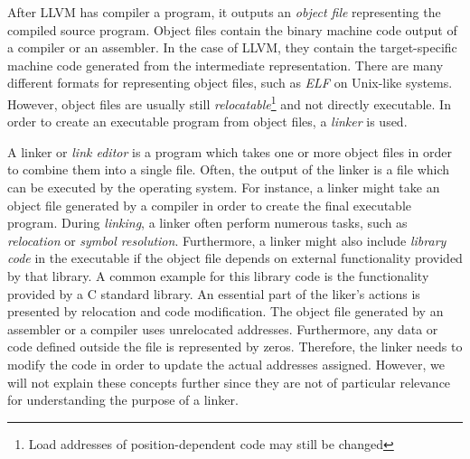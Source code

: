 
After LLVM has compiler a program, it outputs an \emph{object file} representing the compiled source program.
Object files contain the binary machine code output of a compiler or an assembler.
In the case of LLVM, they contain the target-specific machine code generated from the intermediate representation.
There are many different formats for representing object files, such as \emph{ELF} on Unix-like systems.
However, object files are usually still \emph{relocatable}\footnote{Load addresses of position-dependent code may still be changed} and not directly executable.
In order to create an executable program from object files, a \emph{linker} is used.

A linker or \emph{link editor} is a program which takes one or more object files in order to combine them into a single file.
Often, the output of the linker is a file which can be executed by the operating system.
For instance, a linker might take an object file generated by a compiler in order to create the final executable program.
During \emph{linking}, a linker often perform numerous tasks, such as \emph{relocation} or \emph{symbol resolution}.
Furthermore, a linker might also include \emph{library code} in the executable if the object file depends on external functionality provided by that library.
A common example for this library code is the functionality provided by a C standard library.
An essential part of the liker's actions is presented by relocation and code modification.
The object file generated by an assembler or a compiler uses unrelocated addresses.
Furthermore, any data or code defined outside the file is represented by zeros.
Therefore, the linker needs to modify the code in order to update the actual addresses assigned.
However, we will not explain these concepts further since they are not of particular relevance for understanding the purpose of a linker.

